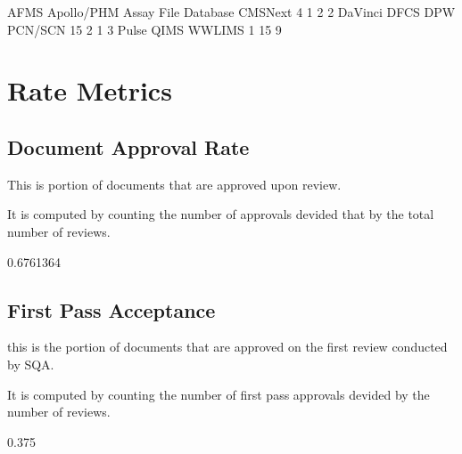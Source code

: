 \documentclass{article}
\begin{document}
\begin{Schunk}
\begin{Soutput}
               AFMS          Apollo/PHM Assay File Database             CMSNext 
                  4                   1                   2                   2 
            DaVinci                DFCS                 DPW             PCN/SCN 
                 15                   2                   1                   3 
              Pulse                QIMS              WWLIMS 
                  1                  15                   9 
\end{Soutput}
\end{Schunk}



\section{Rate Metrics}
\subsection{Document Approval Rate}
This is portion of documents that are approved upon review.

It is computed by counting the number of approvals devided that by the total number of reviews.

\begin{Schunk}
\begin{Soutput}
[1] 0.6761364
\end{Soutput}
\end{Schunk}

\subsection{First Pass Acceptance}
this is the portion of documents that are approved on the first review conducted
by SQA.

It is computed by counting the number of first pass approvals devided by
the number of reviews.

\begin{Schunk}
\begin{Soutput}
[1] 0.375
\end{Soutput}
\end{Schunk}
\end{document}
